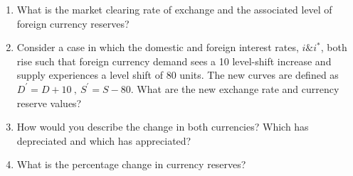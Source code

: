 \documentclass[12pt]{article}
\begin{document}
\begin{enumerate}[1)]
	
\item What is the market clearing rate of exchange and the associated level of foreign currency reserves?

\vspace{1in}

\item Consider a case in which the domestic and foreign interest rates, $i \& i^*$, both rise such that foreign currency demand sees a 10 level-shift increase and supply experiences a level shift of 80 units. The new curves are defined as $D^{'} = D + 10 \ , \ S^{'} = S - 80$.
What are the new exchange rate and currency reserve values?

\vspace{1in}

\item How would you describe the change in both currencies? Which has depreciated and which has appreciated?

\vspace{1in}

\item What is the percentage change in currency reserves?

\vspace{1in}
	
\end{enumerate}
\end{document}

